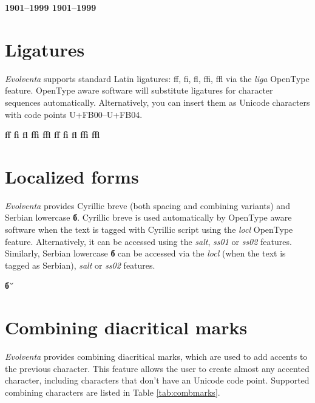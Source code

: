 \documentclass[a4paper,12pt,oneside,extrafontsizes]{memoir}
\begin{document}
\begin{center}
\bfseries\Huge
{1901--1999}
\djvuarrow
{1901--1999}
\end{center}

\section{Ligatures}

\emph{Evolventa} supports standard Latin ligatures: ff, fi, fl, ffi, ffl via the \emph{liga} OpenType feature. OpenType aware software will substitute ligatures for character sequences automatically. Alternatively, you can insert them as Unicode characters with code points U+FB00--U+FB04.

\begin{center}
\bfseries\Huge
{ff fi fl ffi ffl}
\djvuarrow
{ff fi fl ffi ffl}
\end{center}

\section{Localized forms}

\emph{Evolventa} provides Cyrillic breve (both spacing and combining variants) and Serbian lowercase \textbf{б}. Cyrillic breve is used automatically by OpenType aware software when the text is tagged with Cyrillic script using the \emph{locl} OpenType feature. Alternatively, it can be accessed using the \emph{salt}, \emph{ss01} or \emph{ss02} features. Similarly, Serbian lowercase \textbf{б} can be accessed via the \emph{locl} (when the text is tagged as Serbian), \emph{salt} or \emph{ss02} features.

\begin{center}
\bfseries\Huge
{б˘} 
\end{center}

\section{Combining diacritical marks}

\emph{Evolventa} provides combining diacritical marks, which are used to add accents to the previous character. This feature allows the user to create almost any accented character, including characters that don't have an Unicode code point. Supported combining characters are listed in Table \ref{tab:combmarks}.
\end{document}
